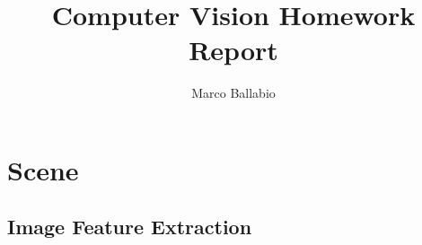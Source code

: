 \documentclass[titlepage]{article}
\title{Computer Vision Homework Report}
\author{Marco Ballabio}
\date{\vspace{-5ex}}
\begin{document}
\maketitle
{}
\newpage
{}

\section{Scene}

\subsection{Image Feature Extraction}
\end{document}
